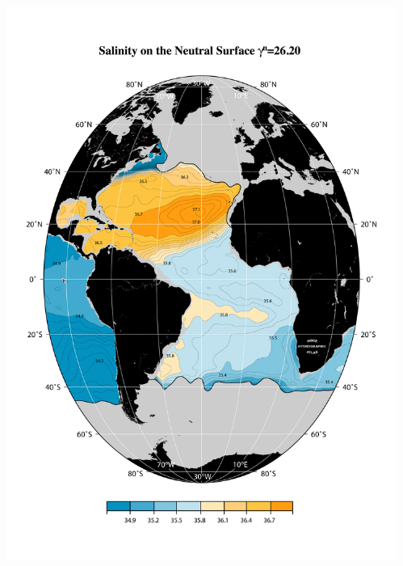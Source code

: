 \documentclass{beamer}
\begin{document}

\begin{frame}[plain,t]

    \begin{columns}
      \begin{column}{0.5\textwidth}
          \includegraphics[width=\textwidth]{salnty_isopyc_jpg/gam2620_sal.jpg}
       \end{column}
      \begin{column}{0.5\textwidth}

\end{column}
\end{columns}
\end{frame}
\end{document}

